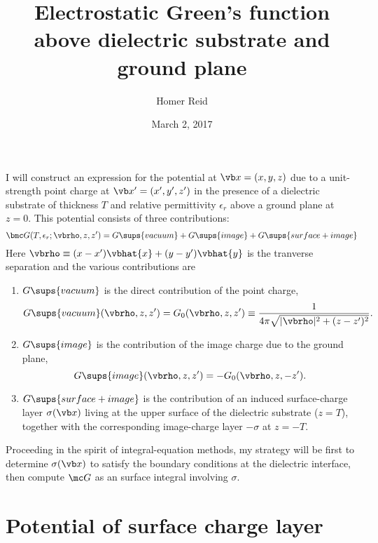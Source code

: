 \documentclass[letterpaper]{article}
\title {Electrostatic Green's function above dielectric substrate
        and ground plane 
       }
\author {Homer Reid}
\date {March 2, 2017}
\begin{document}
\pagestyle{myheadings}
\maketitle


I will construct an expression for the potential
at $\vb x=(x,y,z)$ due to a unit-strength point charge at
$\vb x^\prime=(x^\prime,y^\prime,z^\prime)$ in the presence
of a dielectric substrate of thickness $T$ and relative
permittivity $\epsilon_r$ above a ground plane at $z=0$.
This potential consists of three contributions:
$$ \bmc G(T, \epsilon_r; \vbrho, z, z^\prime)
   = G\sups{vacuum} + G\sups{image} + G\sups{surface+image}
$$
Here $\vbrho\equiv (x-x^\prime)\vbhat{x} + (y-y^\prime)\vbhat{y}$
is the tranverse separation and the various contributions are
\begin{enumerate}
 \item $G\sups{vacuum}$ is the direct contribution
       of the point charge,
       $$G\sups{vacuum}(\vbrho, z, z^\prime)
         =G_0(\vbrho,z,z^\prime)\equiv
           \frac{1}{4\pi\sqrt{|\vbrho|^2 + (z-z^\prime)^2}}.
       $$
 \item $G\sups{image}$ is the contribution of the image charge
       due to the ground plane,
       $$G\sups{image}(\vbrho, z, z^\prime)
         =-G_0(\vbrho,z,-z^\prime).
       $$
 \item $G\sups{surface+image}$ is the contribution of an
       induced surface-charge layer $\sigma(\vb x)$ living 
       at the upper surface of the dielectric substrate ($z=T$),
       together with the corresponding image-charge layer 
       $-\sigma$ at $z=-T$.
\end{enumerate}
Proceeding in the spirit of integral-equation methods,
my strategy will be first to determine $\sigma(\vb x)$ to satisfy
the boundary conditions at the dielectric interface, then 
compute $\mc G$ as an surface integral involving $\sigma.$

\section{Potential of surface charge layer}
\end{document}
